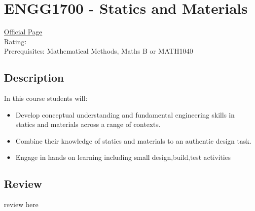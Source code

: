 \hypertarget{ENGG1700}{\section{ENGG1700 - Statics and Materials}}

\large
\textcolor{turbo_purple}{\href{https://my.uq.edu.au/programs-courses/course.html?course_code=ENGG1700}{Official Page}} \\
Rating: \cstar\cstar\cstar\cstar\ostar \\
Prerequisites: Mathematical Methods, Maths B or MATH1040

\normalsize
\subsection*{Description}
In this course students will:
\begin{itemize}
    \item Develop conceptual understanding and fundamental engineering skills in statics and materials across a range of contexts.
    \item Combine their knowledge of statics and materials to an authentic design task.
    \item Engage in hands on learning including small design,build,test activities
\end{itemize}

\subsection*{Review}
review here
